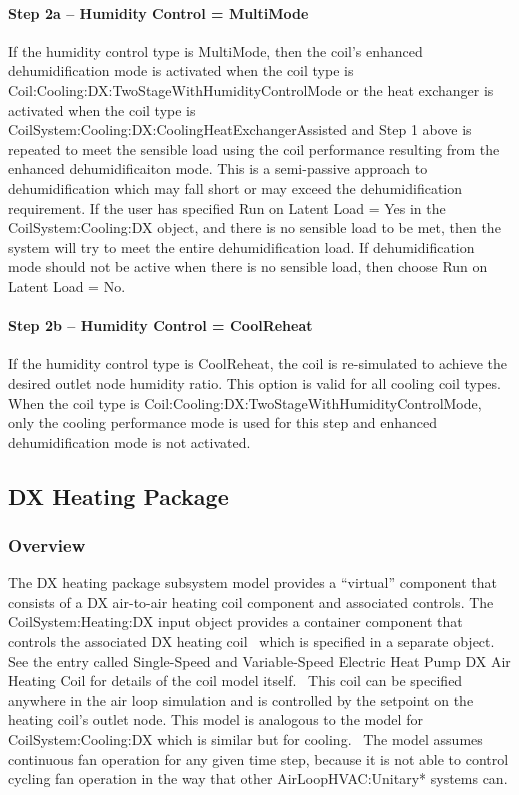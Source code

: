\paragraph{Step 2a -- Humidity Control = MultiMode}\label{step-2a-humidity-control-multimode-1}

If the humidity control type is MultiMode, then the coil's enhanced dehumidification mode is activated when the coil type is Coil:Cooling:DX:TwoStageWithHumidityControlMode or the heat exchanger is activated when the coil type is CoilSystem:Cooling:DX:CoolingHeatExchangerAssisted and Step 1 above is repeated to meet the sensible load using the coil performance resulting from the enhanced dehumidificaiton mode. This is a semi-passive approach to dehumidification which may fall short or may exceed the dehumidification requirement. If the user has specified Run on Latent Load = Yes in the CoilSystem:Cooling:DX object, and there is no sensible load to be met, then the system will try to meet the entire dehumidification load. If dehumidification mode should not be active when there is no sensible load, then choose Run on Latent Load = No.

\paragraph{Step 2b -- Humidity Control = CoolReheat}\label{step-2b-humidity-control-coolreheat-1}

If the humidity control type is CoolReheat, the coil is re-simulated to achieve the desired outlet node humidity ratio. This option is valid for all cooling coil types. When the coil type is Coil:Cooling:DX:TwoStageWithHumidityControlMode, only the cooling performance mode is used for this step and enhanced dehumidification mode is not activated.

\subsection{DX Heating Package}\label{dx-heating-package}

\subsubsection{Overview}\label{overview-6}

The DX heating package subsystem model provides a ``virtual'' component that consists of a DX air-to-air heating coil component and associated controls. The CoilSystem:Heating:DX input object provides a container component that controls the associated DX heating coil~ which is specified in a separate object. See the entry called Single-Speed and Variable-Speed Electric Heat Pump DX Air Heating Coil for details of the coil model itself.~ This coil can be specified anywhere in the air loop simulation and is controlled by the setpoint on the heating coil's outlet node. This model is analogous to the model for CoilSystem:Cooling:DX which is similar but for cooling.~ The model assumes continuous fan operation for any given time step, because it is not able to control cycling fan operation in the way that other AirLoopHVAC:Unitary* systems can.

